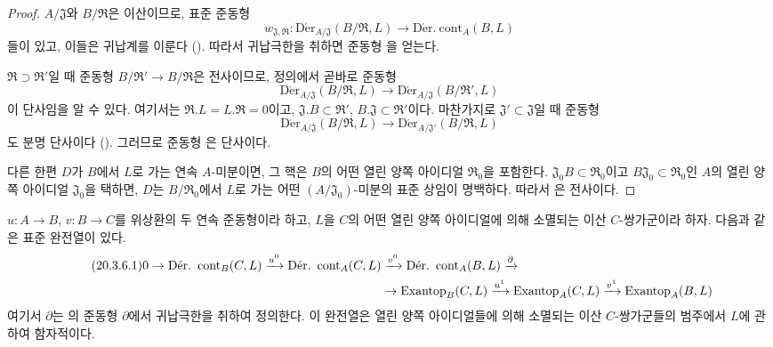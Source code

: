 \begin{proof}
$A/\mathfrak J$와 $B/\mathfrak R$은 이산이므로, 표준 준동형
\[
  w_{\mathfrak J,\mathfrak R}:
  \operatorname{D\acute{e}r}_{A/\mathfrak J}(B/\mathfrak R,L)
  \longrightarrow\operatorname{D\acute{e}r.\ cont}_A(B,L)
\]
들이 있고, 이들은 귀납계를 이룬다 (). 따라서
귀납극한을 취하면 준동형 을 얻는다.

$\mathfrak R\supset\mathfrak R'$일 때 준동형
$B/\mathfrak R'\to B/\mathfrak R$은 전사이므로, 정의에서 곧바로
준동형
\[
  \operatorname{D\acute{e}r}_{A/\mathfrak J}(B/\mathfrak R,L)
  \longrightarrow
  \operatorname{D\acute{e}r}_{A/\mathfrak J}(B/\mathfrak R',L)
\]
이 단사임을 알 수 있다. 여기서는
$\mathfrak R.L=L.\mathfrak R=0$이고,
$\mathfrak J.B\subset\mathfrak R'$,
$B.\mathfrak J\subset\mathfrak R'$이다. 마찬가지로
$\mathfrak J'\subset\mathfrak J$일 때 준동형
\[
  \operatorname{D\acute{e}r}_{A/\mathfrak J}(B/\mathfrak R,L)
  \longrightarrow
  \operatorname{D\acute{e}r}_{A/\mathfrak J'}(B/\mathfrak R,L)
\]
도 분명 단사이다 (). 그러므로 준동형
은 단사이다.

다른 한편 $D$가 $B$에서 $L$로 가는 연속 $A$-미분이면, 그 핵은
$B$의 어떤 열린 양쪽 아이디얼 $\mathfrak R_0$을 포함한다.
$\mathfrak J_0B\subset\mathfrak R_0$이고
$B\mathfrak J_0\subset\mathfrak R_0$인 $A$의 열린 양쪽 아이디얼
$\mathfrak J_0$을 택하면, $D$는 $B/\mathfrak R_0$에서 $L$로 가는
어떤 $(A/\mathfrak J_0)$-미분의 표준 상임이 명백하다. 따라서
은 전사이다.
\end{proof}

\begin{proposition}[20.3.6]
\label{0.20.3.6-ko}
$u:A\to B$, $v:B\to C$를 위상환의 두 연속 준동형이라 하고,
$L$을 $C$의 어떤 열린 양쪽 아이디얼에 의해 소멸되는 이산
$C$-쌍가군이라 하자. 다음과 같은 표준 완전열이 있다.
\begin{align}
\tag{20.3.6.1}
\label{0.20.3.6.1-ko}
  0\to\operatorname{D\acute{e}r.\ cont}_B(C,L)\xrightarrow{u^0}
  \operatorname{D\acute{e}r.\ cont}_A(C,L)&\xrightarrow{v^0}
  \operatorname{D\acute{e}r.\ cont}_A(B,L)\xrightarrow{\partial} \\
  &\to\operatorname{Exantop}_B(C,L)\xrightarrow{u^1}
  \operatorname{Exantop}_A(C,L)\xrightarrow{v^1}
  \operatorname{Exantop}_A(B,L) \notag
\end{align}
여기서 $\partial$는 의 준동형 $\partial$에서
귀납극한을 취하여 정의한다. 이 완전열은 열린 양쪽 아이디얼들에 의해
소멸되는 이산 $C$-쌍가군들의 범주에서 $L$에 관하여 함자적이다.
\end{proposition}

